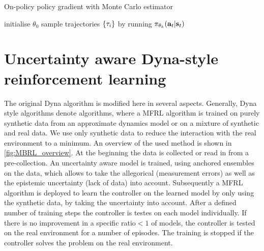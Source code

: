 \documentclass[
 reprint,
 amsmath,amssymb,amsfonts,clevref,
 aps,
prstab,
]{revtex4-2}
\begin{document}
\begin{algorithm}[ht]
\caption{On-policy policy gradient with Monte Carlo estimator \label{alg:pg}}
\begin{algorithmic}[1]
\State initialise $\theta_0$
\State sample trajectories $\{\tau_i\}$ by running $\pi_{\theta_k}(\mathbf{a}_t|\mathbf{s}_t)$ 
\end{algorithmic}
\end{algorithm}

\section{Uncertainty aware Dyna-style reinforcement learning}
The original Dyna algorithm \cite{DYNA} is modified here in several aspects. Generally, Dyna style algorithms denote algorithms, where a MFRL algorithm is trained on purely synthetic data from an approximate dynamics model or on a mixture of synthetic and real data. We use only synthetic data to reduce the interaction with the real environment to a minimum.
An overview of the used method is shown in \cref{fig:MBRL_overview}. At the beginning the data is collected or read in from a pre-collection. An uncertainty aware model is trained, using anchored ensembles on the data, which allows to take the allegorical (measurement errors) as well as the epistemic uncertainty (lack of data) into account. Subsequently a MFRL algorithm is deployed to learn the controller on the learned model by only using the synthetic data, by taking the uncertainty into account. After a defined number of training steps the controller is testes on each model individually. If there is no improvement in a specific ratio$<1$ of models, the controller is tested on the real environment for a number of episodes. The training is stopped if the controller solves the problem on the real environment.
\end{document}
